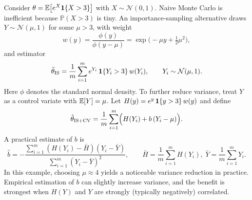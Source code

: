 \begin{example}
Consider
$\theta = \mathbb{E}\bigl[e^X \mathbf{1}\{X>3\}\bigr]$ with $X \sim \mathcal{N}(0,1)$.
Naive Monte Carlo is inefficient because $\mathbb{P}(X>3)$ is tiny.
An importance-sampling alternative draws $Y \sim \mathcal{N}(\mu,1)$ for some $\mu>3$, with weight
\[
 w(y) = \frac{\phi(y)}{\phi(y-\mu)} = \exp\bigl(-\mu y + \tfrac12 \mu^2\bigr),
\]
and estimator
\[
\tilde\theta_{\mathrm{IS}} = \frac{1}{m}\sum_{i=1}^m e^{Y_i}\,\mathbf{1}\{Y_i>3\}\,w(Y_i),
\qquad Y_i \sim \mathcal{N}(\mu,1).
\]
Here $\phi$ denotes the standard normal density.
To further reduce variance, treat $Y$ as a control variate with $\mathbb{E}[Y]=\mu$.
Let
$H(y) = e^{y}\,\mathbf{1}\{y>3\}\,w(y)$ and define
\[
\hat\theta_{\mathrm{IS+CV}} = \frac{1}{m}\sum_{i=1}^m \Bigl(H(Y_i) + b\,(Y_i-\mu)\Bigr).
\]
A practical estimate of $b$ is
\[
\hat b = -\frac{\sum_{i=1}^m (H(Y_i)-\bar H)(Y_i-\bar Y)}{\sum_{i=1}^m (Y_i-\bar Y)^2},
\qquad \bar H = \frac{1}{m}\sum_{i=1}^m H(Y_i),\; \bar Y = \frac{1}{m}\sum_{i=1}^m Y_i.
\]
In this example, choosing $\mu \approx 4$ yields a noticeable variance reduction in practice.
Empirical estimation of $b$ can slightly increase variance, and the benefit is strongest when $H(Y)$ and $Y$ are strongly (typically negatively) correlated.
\end{example}
